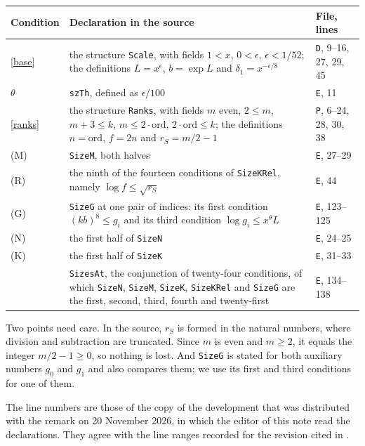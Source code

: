 \documentclass[11pt]{amsart}
\theoremstyle{definition}
\theoremstyle{remark}
\newcommand{\src}[1]{\texttt{#1}}
\newcommand{\tagM}{\textup{(M)}}
\newcommand{\tagR}{\textup{(R)}}
\newcommand{\tagG}{\textup{(G)}}
\newcommand{\tagN}{\textup{(N)}}
\newcommand{\tagK}{\textup{(K)}}
\begin{document}
\begin{center}
\small
\renewcommand{\arraystretch}{1.25}
\begin{tabular}{@{}>{\raggedright\arraybackslash}p{17mm}>{\raggedright\arraybackslash}p{97mm}>{\raggedright\arraybackslash}p{24mm}@{}}
\hline
Condition & Declaration in the source & File, lines\\
\hline
\eqref{base} & the structure \src{Scale}, with fields $1<x$, $0<\epsilon$, $\epsilon<1/52$; the definitions $L=x^{\epsilon}$, $b=\exp L$ and $\delta_1=x^{-\epsilon/8}$ & \src{D}, 9--16, 27, 29, 45\\
$\theta$ & \src{szTh}, defined as $\epsilon/100$ & \src{E}, 11\\
\eqref{ranks} & the structure \src{Ranks}, with fields $m$ even, $2\le m$, $m+3\le k$, $m\le2\cdot\mathrm{ord}$, $2\cdot\mathrm{ord}\le k$; the definitions $n=\mathrm{ord}$, $f=2n$ and $r_S=m/2-1$ & \src{P}, 6--24, 28, 30, 38\\
\tagM & \src{SizeM}, both halves & \src{E}, 27--29\\
\tagR & the ninth of the fourteen conditions of \src{SizeKRel}, namely $\log f\le\sqrt{r_S}$ & \src{E}, 44\\
\tagG & \src{SizeG} at one pair of indices: its first condition $(kb)^8\le g_i$ and its third condition $\log g_i\le x^{\theta}L$ & \src{E}, 123--125\\
\tagN & the first half of \src{SizeN} & \src{E}, 24--25\\
\tagK & the first half of \src{SizeK} & \src{E}, 31--33\\
 & \src{SizesAt}, the conjunction of twenty-four conditions, of which \src{SizeN}, \src{SizeM}, \src{SizeK}, \src{SizeKRel} and \src{SizeG} are the first, second, third, fourth and twenty-first & \src{E}, 134--138\\
\hline
\end{tabular}
\end{center}

Two points need care. In the source, $r_S$ is formed in the natural numbers, where division and subtraction are truncated. Since $m$ is even and $m\ge2$, it equals the integer $m/2-1\ge0$, so nothing is lost. And \src{SizeG} is stated for both auxiliary numbers $g_0$ and $g_1$ and also compares them; we use its first and third conditions for one of them.

The line numbers are those of the copy of the development that was distributed with the remark on 20 November 2026, in which the editor of this note read the declarations. They agree with the line ranges recorded for the revision cited in \cite{archive}.
\end{document}

